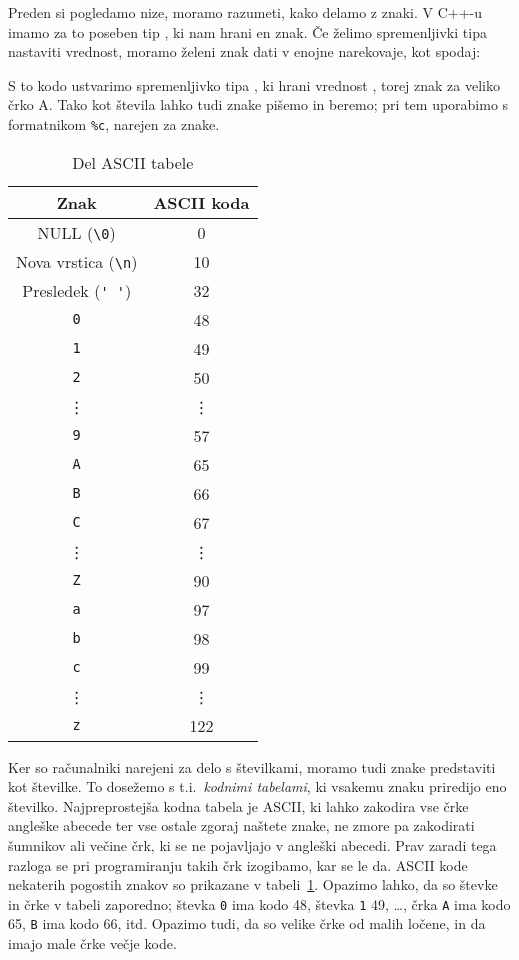 
Preden si pogledamo nize, moramo razumeti, kako delamo z znaki.
V C++-u imamo za to poseben tip , ki nam hrani en znak.
Če želimo spremenljivki tipa  nastaviti vrednost, moramo želeni znak
dati v enojne narekovaje, kot spodaj:


S to kodo ustvarimo spremenljivko tipa , ki hrani vrednost
, torej znak za veliko črko A.
Tako kot števila lahko tudi znake pišemo in beremo; pri tem uporabimo
 s formatnikom \verb+%c+, narejen za znake.


\begin{table}[h!]
  \centering
  \begin{tabular}[h!]{|c|c|}
	\hline
	Znak & ASCII koda \\
	\hline
	NULL (\verb+\0+) & 0 \\
	Nova vrstica (\verb+\n+) & 10 \\
	Presledek (\verb+' '+) & 32 \\
	\hline
	\verb+0+ & 48 \\
	\verb+1+ & 49 \\
	\verb+2+ & 50 \\
	\vdots & \vdots \\
	\verb+9+ & 57 \\
	\hline
	\verb+A+ & 65 \\
	\verb+B+ & 66 \\
	\verb+C+ & 67 \\
	\vdots & \vdots \\
	\verb+Z+ & 90 \\
	\hline
	\verb+a+ & 97 \\
	\verb+b+ & 98 \\
	\verb+c+ & 99 \\
	\vdots & \vdots \\
	\verb+z+ & 122 \\
	\hline
  \end{tabular}
  \caption{Del ASCII tabele}%
  \label{tab:ascii}
\end{table}

Ker so računalniki narejeni za delo s številkami, moramo tudi znake
predstaviti kot številke.
To dosežemo s t.i.~\emph{kodnimi tabelami}, ki vsakemu znaku priredijo eno
številko.
Najpreprostejša kodna tabela je ASCII, ki lahko zakodira vse črke angleške
abecede ter vse ostale zgoraj naštete znake, ne zmore pa zakodirati šumnikov ali
večine črk, ki se ne pojavljajo v angleški abecedi.
Prav zaradi tega razloga se pri programiranju takih črk izogibamo, kar se le da.
ASCII kode nekaterih pogostih znakov so prikazane v tabeli~\ref{tab:ascii}.
Opazimo lahko, da so števke in črke v tabeli zaporedno; števka \verb+0+ ima kodo
48, števka \verb+1+ 49, \ldots, črka \verb+A+ ima kodo 65, \verb+B+ ima kodo 66,
itd.
Opazimo tudi, da so velike črke od malih ločene, in da imajo male črke večje
kode.

